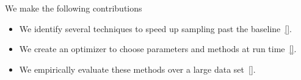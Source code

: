 We make the following contributions
\begin{itemize}
\item We identify several techniques to speed up sampling past the baseline~\ref{}.
\item We create an optimizer to choose parameters and methods at run time~\ref{}.
\item We empirically evaluate these methods over a large data set~\ref{}.
\end{itemize}




